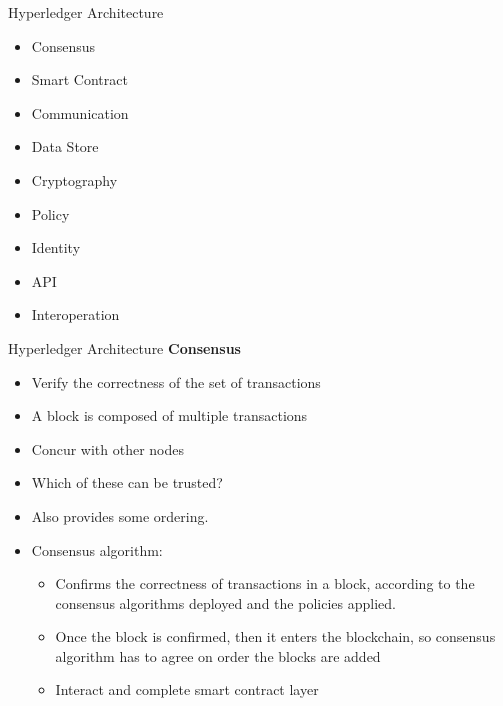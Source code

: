 \documentclass[pdf,table]{beamer}
\begin{document}
\begin{frame}{Hyperledger Architecture \cite{hyperledger:1}}
\begin{itemize}
	\item Consensus 
	\item Smart Contract 
	\item Communication
	\item Data Store
	\item Cryptography
	\item Policy
	\item Identity
	\item API
	\item Interoperation
\end{itemize}
\end{frame}

\begin{frame}{Hyperledger Architecture \cite{hyperledger:1}}
	{\bf Consensus}
\begin{itemize}
	\item Verify the correctness of the set of transactions
	\item A block is composed of multiple transactions
	\item Concur with other nodes
	\item Which of these can be trusted?
	\item Also provides some ordering.
	\item Consensus algorithm:
		\begin{itemize} \pause
			\item Confirms the correctness of transactions in a block, according to the consensus algorithms deployed and the policies applied.
			\item Once the block is confirmed, then it enters the blockchain, so consensus algorithm has to agree on order the blocks are added
			\item Interact and complete smart contract layer 
		\end{itemize}
\end{itemize}
\end{frame}
\end{document}
